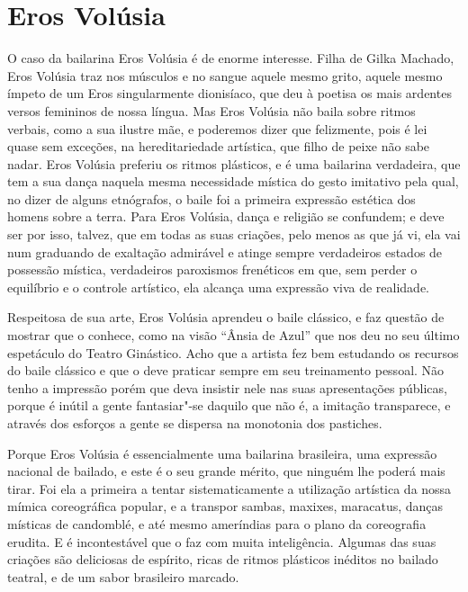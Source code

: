 \chapter{Eros Volúsia}

O caso da bailarina Eros Volúsia é de enorme interesse. Filha de Gilka
Machado, Eros Volúsia traz nos músculos e no sangue aquele mesmo grito,
aquele mesmo ímpeto de um Eros singularmente dionisíaco, que deu à
poetisa os mais ardentes versos femininos de nossa língua. Mas Eros
Volúsia não baila sobre ritmos verbais, como a sua ilustre mãe, e
poderemos dizer que felizmente, pois é lei quase sem exceções, na
hereditariedade artística, que filho de peixe não sabe nadar. Eros
Volúsia preferiu os ritmos plásticos, e é uma bailarina verdadeira, que
tem a sua dança naquela mesma necessidade mística do gesto imitativo
pela qual, no dizer de alguns etnógrafos, o baile foi a primeira
expressão estética dos homens sobre a terra. Para Eros Volúsia, dança e
religião se confundem; e deve ser por isso, talvez, que em todas as suas
criações, pelo menos as que já vi, ela vai num graduando de exaltação
admirável e atinge sempre verdadeiros estados de possessão mística,
verdadeiros paroxismos frenéticos em que, sem perder o equilíbrio e o
controle artístico, ela alcança uma expressão viva de realidade.

Respeitosa de sua arte, Eros Volúsia aprendeu o baile clássico, e faz
questão de mostrar que o conhece, como na visão ``Ânsia de Azul'' que
nos deu no seu último espetáculo do Teatro Ginástico. Acho que a artista
fez bem estudando os recursos do baile clássico e que o deve praticar
sempre em seu treinamento pessoal. Não tenho a impressão porém que deva
insistir nele nas suas apresentações públicas, porque é inútil a gente
fantasiar"-se daquilo que não é, a imitação transparece, e através dos
esforços a gente se dispersa na monotonia dos pastiches.

Porque Eros Volúsia é essencialmente uma bailarina brasileira, uma
expressão nacional de bailado, e este é o seu grande mérito, que ninguém
lhe poderá mais tirar. Foi ela a primeira a tentar sistematicamente a
utilização artística da nossa mímica coreográfica popular, e a transpor
sambas, maxixes, maracatus, danças místicas de candomblé, e até mesmo
ameríndias para o plano da coreografia erudita. E é incontestável que o
faz com muita inteligência. Algumas das suas criações são deliciosas de
espírito, ricas de ritmos plásticos inéditos no bailado teatral, e de um
sabor brasileiro marcado.

